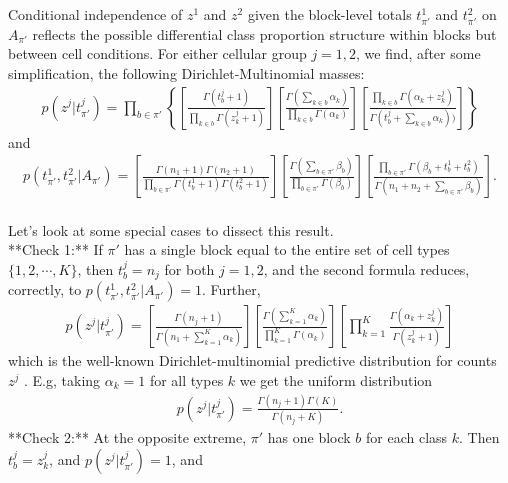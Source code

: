 \documentclass[11pt]{amsart}
\begin{document}
Conditional independence of $z^1$ and $z^2$ given the block-level totals
$t^1_{\pi'}$ and $t^2_{\pi'}$ on $A_{\pi'}$ reflects the possible differential 
class proportion structure within blocks but between cell conditions.
For either cellular group $j=1,2$,
we find, after some simplification, the following Dirichlet-Multinomial masses: 
\begin{align}
p(z^j|t^j_{\pi'}) = \prod_{b \in \pi'} \left\{
\left[ \frac{ \Gamma(t^j_b +1 ) }{\prod_{k \in b} \Gamma( z^j_k + 1 ) } 
\right]
\left[ \frac{\Gamma( \sum_{k \in b} \alpha_k )}{
		\prod_{k\in b} \Gamma( \alpha_k ) } \right] 
       \left[        \frac{ \prod_{k \in b} \Gamma(\alpha_k + z^j_k)  }{
		\Gamma(t^j_b + \sum_{k\in b} \alpha_k ) )}\right]
 \right\}
\end{align}
and
\begin{align}
p(t^1_{\pi'},t^2_{\pi'}| A_{\pi'}) =
 \left[ \frac{ \Gamma(n_1+1) \Gamma(n_2+1) }{ \prod_{b \in \pi'} \Gamma(t^1_b+1) 
   \Gamma( t^2_b + 1 )} \right] 
\left[ \frac{\Gamma( \sum_{b \in \pi'} \beta_b  )}{
   \prod_{b \in \pi'} \Gamma(\beta_b )} \right] 
 \left[ \frac{ \prod_{b \in \pi'} \Gamma( \beta_b + t^1_b + t^2_b )}{
	\Gamma( n_1 + n_2 + \sum_{b \in \pi'} \beta_b  )} \right].
\end{align}
\hfill\\
Let's look at some special cases to dissect this result. \\
**Check 1:** If $\pi'$ has a single block equal to the entire
 set of cell types $\{1,2, \cdots, K\}$,  then $t^j_b=n_j$ for both $j=1,2$,
and the second formula reduces, correctly, to 
$p(t^1_{\pi'},t^2_{\pi'}| A_{\pi'}) = 1$.  Further,
\begin{eqnarray*}
p(z^j|t^j_{\pi'}) = 
\left[ \frac{ \Gamma(n_j +1 ) }{ \Gamma( n_1 + \sum_{k=1}^K \alpha_k ) }
\right]
\left[ \frac{\Gamma( \sum_{k =1}^K \alpha_k )}{
                \prod_{k=1}^K \Gamma( \alpha_k ) } \right]
       \left[    \prod_{k=1}^K    \frac{  \Gamma(\alpha_k + z^j_k)}{
                \Gamma(z^j_k + 1 )}\right]
\end{eqnarray*}
which is the well-known Dirichlet-multinomial predictive distribution
for counts $z^j$ \cite{Wag}.  E.g, taking $\alpha_k=1$ for all types $k$ 
we get the uniform distribution
\begin{eqnarray*}
p(z^j|t^j_{\pi'}) = 
 \frac{ \Gamma(n_j +1 ) \Gamma(K) }{ \Gamma( n_j + K ) }.
\end{eqnarray*}
**Check 2:** At the opposite extreme, $\pi'$  has one block $b$ for each
 class $k$. Then $t^j_b = z^j_k$, and $p(z^j|t^j_{\pi'}) = 1$, and 
\end{document}
